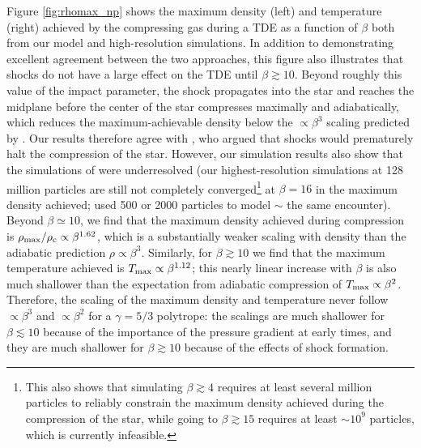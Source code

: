 \documentclass[twocolumn]{aastex62}
\begin{document}
Figure \ref{fig:rhomax_np} shows the maximum density (left) and temperature (right) achieved by the compressing gas during a TDE as a function of $\beta$ both from our model and high-resolution simulations. In addition to demonstrating excellent agreement between the two approaches, this figure also illustrates that shocks do not have a large effect on the TDE until $\beta \gtrsim 10$. Beyond roughly this value of the impact parameter, the shock propagates into the star and reaches the midplane before the center of the star compresses maximally and adiabatically, which reduces the maximum-achievable density below the $\propto \beta^3$ scaling predicted by \citet{carter83}. Our results therefore agree with \citet{Bicknell:1983aa}, who argued that shocks would prematurely halt the compression of the star. However, our simulation results also show that the simulations of \citet{Bicknell:1983aa} were underresolved (our highest-resolution simulations at 128 million particles are still not completely converged\footnote{This also shows that simulating $\beta \gtrsim 4$ requires at least several million particles to reliably constrain the maximum density achieved during the compression of the star, while going to $\beta \gtrsim 15$ requires at least $\sim 10^{9}$ particles, which is currently infeasible.} at $\beta = 16$ in the maximum density achieved; \citet{Bicknell:1983aa} used 500 or 2000 particles to model $\sim$ the same encounter). Beyond $\beta \simeq 10$, we find that the maximum density achieved during compression is $\rho_{\rm max}/\rho_{\rm c} \propto \beta^{1.62}$, which is a substantially weaker scaling with density than the adiabatic prediction $\rho \propto \beta^3$. Similarly, for $\beta \gtrsim 10$ we find that the maximum temperature achieved is $T_{\rm max} \propto \beta^{1.12}$; this nearly linear increase with $\beta$ is also much shallower than the expectation from adiabatic compression of $T_{\rm max} \propto \beta^2$. Therefore, the scaling of the maximum density and temperature never follow $\propto \beta^3$ and $\propto \beta^2$ for a $\gamma = 5/3$ polytrope: the scalings are much shallower for $\beta \lesssim 10$ because of the importance of the pressure gradient at early times, and they are much shallower for $\beta \gtrsim 10$ because of the effects of shock formation.
\end{document}
